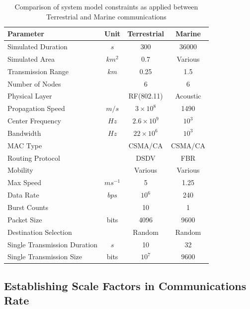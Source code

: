\documentclass[runningheads,a4paper]{llncs}
\begin{document}
\begin{table}[h]
  \caption{Comparison of system model constraints as applied between Terrestrial and Marine communications} \label{tab:sysconstraints}
  \begin{center}
    \setlength{\tabcolsep}{8pt}
    \begin{tabular}{lccc}
      \toprule
      Parameter & Unit & Terrestrial & Marine \\
      \midrule
      Simulated Duration & $s$ & 300 & 36000\\
      Simulated Area & $km^2$ & 0.7 & Various \\
      Transmission Range & $km$ & 0.25 & 1.5 \\
      Number of Nodes & & 6 & 6 \\
      Physical Layer & & RF(802.11) & Acoustic\\
      Propagation Speed& $m/s$ & $3\times10^8$ & 1490\\
      Center Frequency& $Hz$ & $2.6\times10^9$ & $10^3$ \\
      Bandwidth& $Hz$ & $22\times10^6$ & $10^3$\\
      MAC Type & & CSMA/CA & CSMA/CA\\
      Routing Protocol & & DSDV & FBR \\
      Mobility & & Various & Various \\
      Max Speed & $ms^{-1}$ & 5 & 1.25 \\
      Data Rate & $bps$ & $10^6$ & 240 \\
      Burst Counts & & 10 & 1 \\
      Packet Size & bits & 4096 &  9600 \\
      Destination Selection & & Random & Random\\
      Single Transmission Duration & $s$ & 10 & 32 \\
      Single Transmission Size & bits & $10^7$ & $9600$ \\
      \bottomrule
    \end{tabular}
    \setlength{\tabcolsep}{6pt}
  \end{center}
\end{table}


\subsection{Establishing Scale Factors in Communications Rate}
\end{document}
